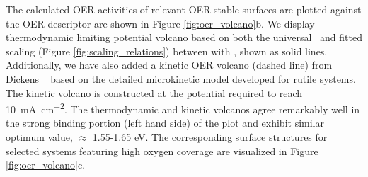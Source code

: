 %
The calculated OER activities of relevant OER stable surfaces are plotted against the \DGOmOH{} OER descriptor are shown in Figure \ref{fig:oer_volcano}b.
%
We display thermodynamic limiting potential volcano based on both the universal~\cite{Man2011} and fitted scaling
(Figure \ref{fig:scaling_relations}) between \DGOOH with \DGOH, shown as solid lines.
%
Additionally, we have also added a kinetic OER volcano (dashed line) from Dickens ~\cite{Dickens2019} based on the detailed microkinetic model developed for rutile systems.
%
The kinetic volcano is constructed at the potential required to reach \SI[mode=text]{10}{\mA\per\cm\squared}.
%
The thermodynamic and kinetic volcanos agree remarkably well in the strong binding portion (left hand side) of the plot and exhibit similar optimum value, \DGOmOH{} $\approx$ \num{1.55}-\num{1.65} eV.
%
The corresponding surface structures for selected systems featuring high oxygen coverage are visualized in Figure \ref{fig:oer_volcano}c.



